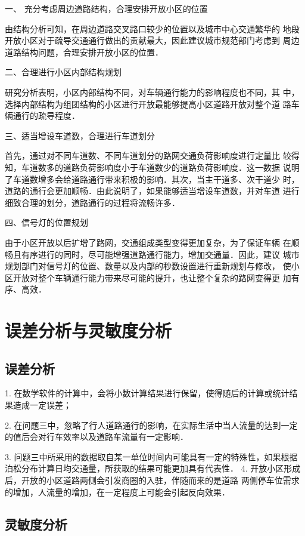 一、 充分考虑周边道路结构，合理安排开放小区的位置

由结构分析可知，在周边道路交叉路口较少的位置以及城市中心交通繁华的
地段开放小区对于疏导交通通行做出的贡献最大，因此建议城市规范部门考虑到
周边道路结构问题，合理安排开放小区的位置．

二、合理进行小区内部结构规划

研究分析表明，小区内部结构不同，对车辆通行能力的影响程度也不同，其
中，选择内部结构为组团结构的小区进行开放最能够提高小区道路开放对整个道
路车辆通行的疏导程度．

三、适当增设车道数，合理进行车道划分

首先，通过对不同车道数、不同车道划分的路网交通负荷影响度进行定量比
较得知，车道数多的道路负荷影响度小于车道数少的道路负荷影响度．这一数据
说明了车道数增多会给道路通行带来积极的影响．其次，当主干道多、次干道少
时，道路的通行会更加顺畅．由此说明了，如果能够适当增设车道数，并对车道
进行细致合理的划分，道路通行的过程将流畅许多．

四、信号灯的位置规划

由于小区开放以后扩增了路网，交通组成类型变得更加复杂，为了保证车辆
在顺畅且有序进行的同时，尽可能增强道路通行能力，增加交通量．因此，建议
城市规划部门对信号灯的位置、数量以及内部的秒数设置进行重新规划与修改，
使小区开放对整个车辆通行能力带来尽可能的提升，也让整个复杂的路网变得更
加有序、高效．

\section{误差分析与灵敏度分析}

\subsection{误差分析}

1. 在数学软件的计算中，会将小数计算结果进行保留，使得随后的计算或统计结
果造成一定误差；

2. 在问题三中，忽略了行人道路通行的影响，在实际生活中当人流量的达到一定
的值后会对行车效率以及道路车流量有一定影响．

3. 问题三中所采用的数据取自某一单位时间内可能具有一定的特殊性，如果根据
泊松分布计算日均交通量，所获取的结果可能更加具有代表性．
4. 开放小区形成后，开放的小区道路两侧会引发商圈的入驻，伴随而来的是道路
两侧停车位需求的增加，人流量的增加，在一定程度上可能会引起反向效果．

\subsection{灵敏度分析}

